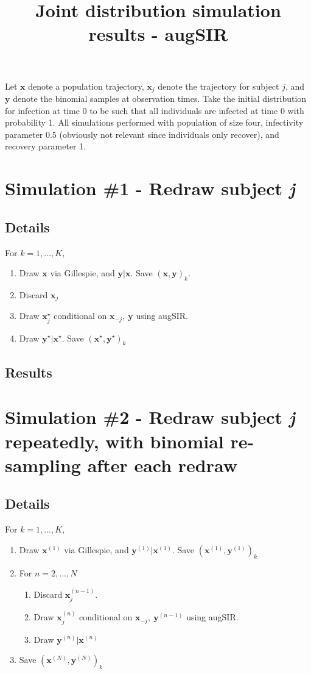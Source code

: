\documentclass[11pt]{article}
\title{Joint distribution simulation results - augSIR}
\author{}
\newcommand{\bx}{\mathbf{x}}
\newcommand{\by}{\mathbf{y}}
\begin{document}
\maketitle
Let $ \bx $ denote a population trajectory, $ \bx_j $ denote the trajectory for subject $ j $, and $ \by $ denote the binomial samples at observation times. Take the initial distribution for infection at time 0 to be such that all individuals are infected at time 0 with probability 1. All simulations performed with population of size four, infectivity parameter 0.5 (obviously not relevant since individuals only recover), and recovery parameter 1. 

\section*{Simulation \#1 - Redraw subject \textit{j}}
\subsection*{Details}
For $ k = 1,\dots,K $,
\begin{enumerate}
	\item Draw $ \bx $ via Gillespie, and $ \by|\bx $. Save $ (\bx, \by)_{k} $. 
	\item Discard $ \bx_j $
	\item Draw $ \bx_j^\star $ conditional on $ \bx_{-j},\ \by $ using augSIR.
	\item Draw $ \by^\star|\bx^\star $. Save $ (\bx^\star, \by^\star)_{k} $ 
\end{enumerate}
\subsection*{Results}


\newpage
\section*{Simulation \#2 - Redraw subject \textit{j} repeatedly, with binomial re-sampling after each redraw}
\subsection*{Details}
For $ k = 1,\dots,K $,
\begin{enumerate}
	\item Draw $ \bx^{(1)} $ via Gillespie, and $ \by^{(1)}|\bx^{(1)} $. Save $ (\bx^{(1)}, \by^{(1)})_{k} $
	\item For $ n = 2,\dots,N $
	\begin{enumerate}
		\item Discard $ \bx_j^{(n-1)} $.
		\item Draw $ \bx_j^{(n)} $ conditional on $ \bx_{-j},\ \by^{(n-1)} $ using augSIR.
		\item Draw $ \by^{(n)}|\bx^{(n)} $
	\end{enumerate} 
	\item Save $ (\bx^{(N)}, \by^{(N)})_{k} $
\end{enumerate}
\end{document}
